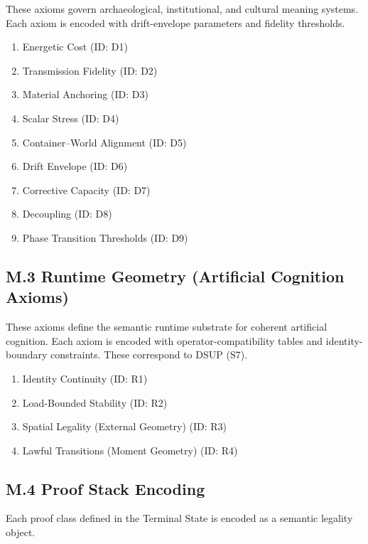 These axioms govern archaeological, institutional, and cultural meaning systems.
Each axiom is encoded with drift-envelope parameters and fidelity thresholds.

\begin{enumerate}
    \item Energetic Cost \hfill (ID: D1)
    \item Transmission Fidelity \hfill (ID: D2)
    \item Material Anchoring \hfill (ID: D3)
    \item Scalar Stress \hfill (ID: D4)
    \item Container–World Alignment \hfill (ID: D5)
    \item Drift Envelope \hfill (ID: D6)
    \item Corrective Capacity \hfill (ID: D7)
    \item Decoupling \hfill (ID: D8)
    \item Phase Transition Thresholds \hfill (ID: D9)
\end{enumerate}

\subsection*{M.3 Runtime Geometry (Artificial Cognition Axioms)}

These axioms define the semantic runtime substrate for coherent artificial
cognition. Each axiom is encoded with operator-compatibility tables and
identity-boundary constraints. These correspond to DSUP (S7).

\begin{enumerate}
    \item Identity Continuity \hfill (ID: R1)
    \item Load-Bounded Stability \hfill (ID: R2)
    \item Spatial Legality (External Geometry) \hfill (ID: R3)
    \item Lawful Transitions (Moment Geometry) \hfill (ID: R4)
\end{enumerate}

\subsection*{M.4 Proof Stack Encoding}

Each proof class defined in the Terminal State is encoded as a semantic legality
object.

